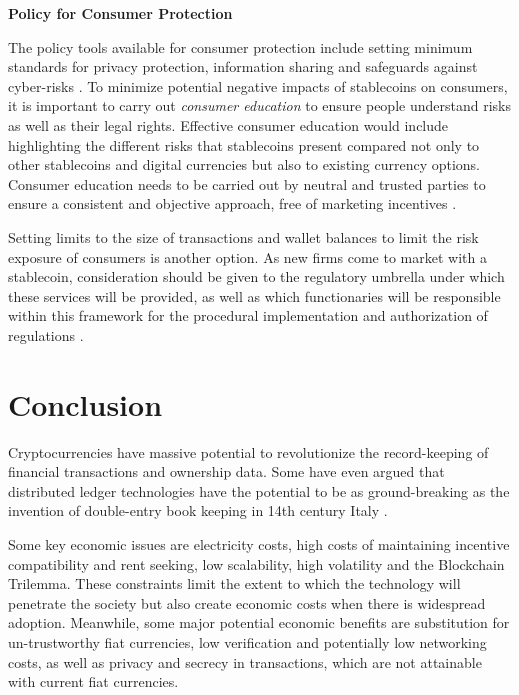 \documentclass[12pt]{article}
\newcommand{\1}{\mathbbm 1}
\begin{document}
		

		
		
		
		
		
	\textbf{Policy for Consumer Protection}
		
		The policy tools available for consumer protection include setting minimum standards for privacy protection, information sharing and safeguards against cyber-risks \cite{oliverwyman2018}.	To minimize potential negative impacts of stablecoins on consumers, it is important to carry out \textit{consumer education} to ensure people understand risks as well as their legal rights. Effective consumer education would include highlighting the different risks that stablecoins present compared not only to other stablecoins and digital currencies but also to existing currency options. Consumer education needs to be carried out by neutral and trusted parties to ensure a consistent and objective approach, free of marketing incentives \cite{WEF2021governance}.
		
		
		Setting limits to the size of transactions	and wallet balances to limit the risk exposure of consumers is another option. As new firms come to market with a stablecoin, consideration should be given to the regulatory umbrella under which these services will be provided, as well as which functionaries will be responsible within this framework for the procedural implementation and authorization of regulations \cite{WEF2021governance}.
		
		
		
	
		
		
		
		
		\section{Conclusion}
		
		
		Cryptocurrencies have massive potential to revolutionize the record-keeping of financial transactions and ownership data. Some have even argued that distributed ledger technologies have the potential to be as ground-breaking as the invention of double-entry book keeping in 14th century Italy \cite{abadi2018blockchain}.
		
		Some key economic issues are electricity costs, high costs of maintaining incentive compatibility and rent seeking, low scalability, high volatility and the Blockchain Trilemma. These constraints limit the extent to which the technology will penetrate the society but also create economic costs when there is widespread adoption. Meanwhile, some major potential economic benefits are substitution for un-trustworthy fiat currencies, low verification and potentially low networking costs, as well as privacy and secrecy in transactions, which are not attainable with current fiat currencies.
		
\end{document}
